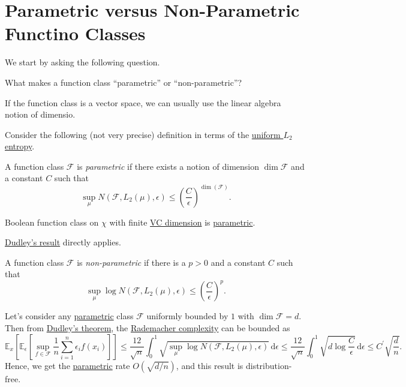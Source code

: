 \section{Parametric versus Non-Parametric Functino Classes}
We start by asking the following question.

\begin{problem*}
	What makes a function class ``parametric'' or ``non-parametric''?
\end{problem*}
\begin{answer}
	If the function class is a vector space, we can usually use the linear algebra notion of dimensio.
\end{answer}

Consider the following (not very precise) definition in terms of the \hyperref[def:Koltchinskii-Pollard-entropy]{uniform \(L_2\) entropy}.

\begin{definition}[Parametric]\label{def:parametric}
	A function class \(\mathscr{F} \) is \emph{parametric} if there exists a notion of dimension \(\dim \mathscr{F} \) and a constant \(C\) such that
	\[
		\sup _\mu N(\mathscr{F} , L_2(\mu ), \epsilon ) \leq \left( \frac{C}{\epsilon } \right) ^{\dim(\mathscr{F} )}.
	\]
\end{definition}

\begin{eg}
	Boolean function class on \(\chi \) with finite \hyperref[def:VC-dimension]{VC dimension} is \hyperref[def:parametric]{parametric}.
\end{eg}
\begin{explanation}
	\hyperref[thm:Dudley]{Dudley's result} directly applies.
\end{explanation}

\begin{definition}\label{def:non-parametric}
	A function class \(\mathscr{F} \) is \emph{non-parametric} if there is a \(p > 0\) and a constant \(C\) such that
	\[
		\sup _\mu \log N(\mathscr{F} , L_2(\mu ), \epsilon ) \leq \left( \frac{C}{\epsilon } \right) ^p.
	\]
\end{definition}

Let's consider any \hyperref[def:parametric]{parametric} class \(\mathscr{F} \) uniformly bounded by \(1\) with \(\dim \mathscr{F} = d\). Then from \hyperref[thm:Dudley]{Dudley's theorem}, the \hyperref[def:Rademacher-complexity]{Rademacher complexity} can be bounded as
\[
	\mathbb{E}_{x}\left[\mathbb{E}_{\epsilon }\left[\sup _{f\in \mathscr{F} } \frac{1}{n}\sum_{i=1}^{n} \epsilon _i f(x_i) \right]  \right]
	\leq \frac{12}{\sqrt{n} } \int_{0}^{1} \sqrt{\sup _\mu \log N(\mathscr{F} , L_2(\mu ), \epsilon )} \,\mathrm{d}\epsilon
	\leq \frac{12}{\sqrt{n} } \int_{0}^{1} \sqrt{d \log \frac{C}{\epsilon }} \,\mathrm{d}\epsilon
	\leq C^{\prime} \sqrt{\frac{d}{n}}.
\]
Hence, we get the \hyperref[def:parametric]{parametric} rate \(O(\sqrt{d / n} )\), and this result is distribution-free.

